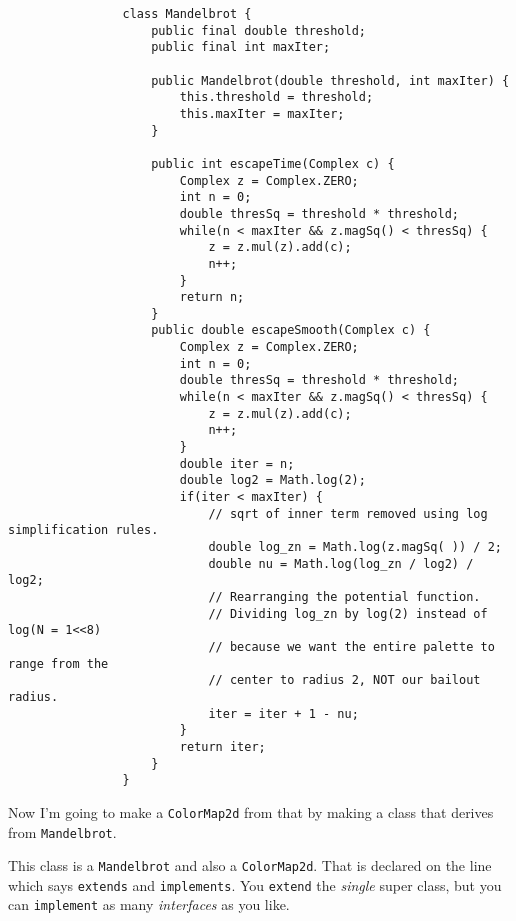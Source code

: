 \documentclass{article}
\begin{document}
            \begin{verbatim}            
                class Mandelbrot {
                    public final double threshold;
                    public final int maxIter;
    
                    public Mandelbrot(double threshold, int maxIter) {
                        this.threshold = threshold;
                        this.maxIter = maxIter;
                    }

                    public int escapeTime(Complex c) {
                        Complex z = Complex.ZERO;
                        int n = 0;
                        double thresSq = threshold * threshold;
                        while(n < maxIter && z.magSq() < thresSq) {
                            z = z.mul(z).add(c); 
                            n++;
                        }
                        return n;
                    }
                    public double escapeSmooth(Complex c) {
                        Complex z = Complex.ZERO;
                        int n = 0;
                        double thresSq = threshold * threshold;
                        while(n < maxIter && z.magSq() < thresSq) {
                            z = z.mul(z).add(c); 
                            n++;
                        }
                        double iter = n;
                        double log2 = Math.log(2);
                        if(iter < maxIter) {
                            // sqrt of inner term removed using log simplification rules.
                            double log_zn = Math.log(z.magSq( )) / 2;
                            double nu = Math.log(log_zn / log2) / log2;
                            // Rearranging the potential function.
                            // Dividing log_zn by log(2) instead of log(N = 1<<8)
                            // because we want the entire palette to range from the
                            // center to radius 2, NOT our bailout radius.
                            iter = iter + 1 - nu;
                        }
                        return iter;
                    }
                }
            \end{verbatim}
            
            \newpage
            Now I'm going to make a \texttt{ColorMap2d} from that by making a class that derives from \texttt{Mandelbrot}.
        
            This class is a \texttt{Mandelbrot} and also a \texttt{ColorMap2d}. That is declared on the line which says \texttt{extends}
            and \texttt{implements}. You \texttt{extend} the \emph{single} super class, but you can \texttt{implement} as many
            \emph{interfaces} as you like.
            
\end{document}
